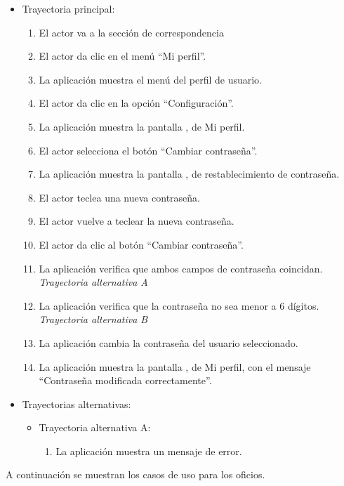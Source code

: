 			\begin{itemize}
				\item Trayectoria principal:
					\begin{enumerate}
						\item El actor va a la sección de correspondencia 
						\item El actor da clic en el menú ``Mi perfil''.
						\item La aplicación muestra el menú del perfil de usuario.
						\item El actor da clic en la opción ``Configuración''.
						\item La aplicación muestra la pantalla , de Mi perfil.
						\item El actor selecciona el botón ``Cambiar contraseña''.
						\item La aplicación muestra la pantalla , de restablecimiento de contraseña.
						\item El actor teclea una nueva contraseña.
						\item El actor vuelve a teclear la nueva contraseña.
						\item El actor da clic al botón ``Cambiar contraseña''.
						\item La aplicación verifica que ambos campos de contraseña coincidan. \textsl{Trayectoria alternativa A}
						\item La aplicación verifica que la contraseña no sea menor a 6 dígitos. \textsl{Trayectoria alternativa B}
						\item La aplicación cambia la contraseña del usuario seleccionado.
						\item La aplicación muestra la pantalla , de Mi perfil, con el mensaje ``Contraseña modificada correctamente''.
					\end{enumerate}
				\item Trayectorias alternativas:
					\begin{itemize}
						\item Trayectoria alternativa A:
							\begin{enumerate}
								\item La aplicación muestra un mensaje de error.
							\end{enumerate}
					\end{itemize}
			\end{itemize}


A continuación se muestran los casos de uso para los oficios.

\newpage

